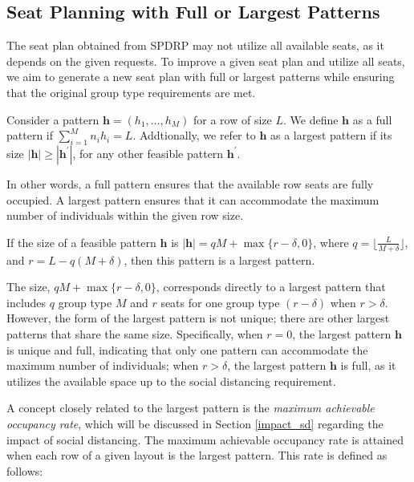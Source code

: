 \subsection{Seat Planning with Full or Largest Patterns}\label{seat_planning_full_largest}

The seat plan obtained from \textup{SPDRP} may not utilize all available seats, as it depends on the given requests. To improve a given seat plan and utilize all seats, we aim to generate a new seat plan with full or largest patterns while ensuring that the original group type requirements are met.

\begin{definition}
Consider a pattern $\bm{h} = (h_1, \ldots, h_M)$ for a row of size $L$. We define $\bm{h}$ as a full pattern if $\sum_{i=1}^{M} n_i h_i = L$. Addtionally, we refer to $\bm{h}$ as a largest pattern if its size $|\bm{h}| \geq |\bm{h}^{\prime}|$, for any other feasible pattern $\bm{h}^{\prime}$.
\end{definition}

In other words, a full pattern ensures that the available row seats are fully occupied. A largest pattern ensures that it can accommodate the maximum number of individuals within the given row size.

\begin{prop}\label{lem_pattern}
If the size of a feasible pattern $\bm{h}$ is $|\bm{h}| = qM + \max\{r-\delta, 0\}$, where $q = \lfloor \frac{L}{M + \delta} \rfloor$, and $r = L - q (M + \delta)$, then this pattern is a largest pattern.
\end{prop}

The size, $qM + \max\{r-\delta, 0\}$, corresponds directly to a largest pattern that includes $q$ group type $M$ and $r$ seats for one group type $(r-\delta)$ when $r>\delta$. However, the form of the largest pattern is not unique; there are other largest patterns that share the same size. Specifically, when $r = 0$, the largest pattern $\bm{h}$ is unique and full, indicating that only one pattern can accommodate the maximum number of individuals; when $r > \delta$, the largest pattern $\bm{h}$ is full, as it utilizes the available space up to the social distancing requirement.

A concept closely related to the largest pattern is the \textit{maximum achievable occupancy rate}, which will be discussed in Section \ref{impact_sd} regarding the impact of social distancing. The maximum achievable occupancy rate is attained when each row of a given layout is the largest pattern. This rate is defined as follows:


